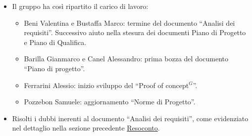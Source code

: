 \begin{itemize}
	\item Il gruppo ha così ripartito il carico di lavoro:
	\begin{itemize}
		\item Beni Valentina e Bustaffa Marco: termine del documento ``Analisi dei requisiti''. Successivo aiuto nella stesura dei documenti Piano di Progetto e Piano di Qualifica. 
		\item Barilla Gianmarco e Canel Alessandro: prima bozza del documento ``Piano di progetto''.
		\item Ferrarini Alessio: inizio sviluppo del ``Proof of concept$^{G}$''.
		\item Pozzebon Samuele: aggiornamento ``Norme di Progetto''.
	\end{itemize}
	\item Risolti i dubbi inerenti al documento ``Analisi dei requisiti'', come evidenziato nel dettaglio nella sezione precedente \hyperref[sec:Resoconto]{Resoconto}.
\end{itemize}